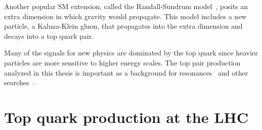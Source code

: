 Another popular SM extension, called the Randall-Sundrum model~\cite{Lillie:2007yh}, posits an extra dimension in which gravity would propagate. This model includes a new particle, a Kaluza-Klein gluon, that propagates into the extra dimension and decays into a top quark pair.


Many of the signals for new physics are dominated by the top quark since heavier particles are more sensitive to higher energy scales.  The top pair production analyzed in this thesis is important as a background for \ttbar resonances~\cite{ATLAS-CONF-2015-009} and other searches~\cite{Aad:2014kra}.

\section{Top quark production at the LHC}

